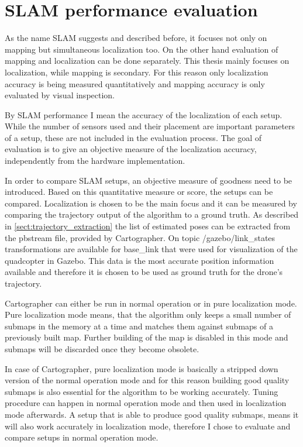 \section{SLAM performance evaluation}
As the name SLAM suggests and described before, it focuses not only on mapping but simultaneous 
localization too. On the other hand evaluation of mapping and localization can be done separately.
This thesis mainly focuses on localization, while mapping is secondary. For this
reason only localization accuracy is being measured quantitatively and mapping accuracy is 
only evaluated by visual inspection.

By SLAM performance I mean the accuracy of the localization of each setup. While the number of 
sensors used and their placement are important parameters of a setup, these are not included in
the evaluation process. The goal of evaluation is to give an objective measure of the localization
accuracy, independently from the hardware implementation. 

In order to compare SLAM setups, an objective measure of goodness need to be introduced. Based 
on this quantitative measure or score, the setups can be compared. Localization is chosen to be 
the main focus and it can be measured by comparing the trajectory output of the algorithm
to a ground truth. 
As described in \ref{sect:trajectory_extraction} the list of estimated poses can be extracted 
from the pbstream file, provided by Cartographer. On topic /gazebo/link\_states transformations
are available for base\_link that were used for visualization of the quadcopter in Gazebo. 
This data is the most accurate position information available and therefore it is chosen to be used as
ground truth for the drone's trajectory.

Cartographer can either be run in normal operation or in pure localization mode. Pure localization
mode means, that the algorithm only keeps a small number of submaps in the memory at a time and 
matches them against submaps of a previously built map. Further building of the map is disabled 
in this mode and submaps will be discarded once they become obsolete. 

In case of Cartographer, pure localization mode is basically a stripped down version of the normal
operation mode and for this reason building good quality submaps is also essential for the algorithm to 
be working accurately. Tuning procedure can happen in normal operation mode and then used in 
localization mode afterwards. A setup that is able to produce good quality submaps, means it
will also work accurately in localization mode, therefore I chose to evaluate and compare setups
in normal operation mode. 

